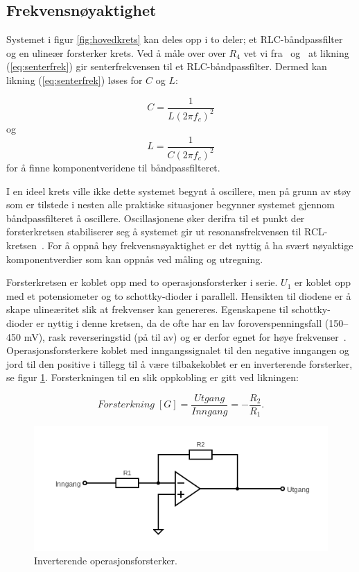 \documentclass[a4paper,11pt,norsk]{article}
\begin{document}
\subsection{Frekvensnøyaktighet}
\label{sub:frekvensnøyaktighet}
Systemet i figur \ref{fig:hovedkrets} kan deles opp i to deler; et RLC-båndpassfilter og en ulineær forsterker krets. Ved å måle over over $R_4$ vet vi fra~\cite{D2} og~\cite{D3} at likning (\ref{eq:senterfrek}) gir senterfrekvensen til et RLC-båndpassfilter.
Dermed kan likning (\ref{eq:senterfrek}) løses for $C$ og $L$:

\begin{equation}
    C = \frac{1}{L(2\pi f_c)^2}
    \label{eq:kondensatorverdi}
\end{equation}
og
\begin{equation}
    L = \frac{1}{C(2\pi f_c)^2}
\end{equation}
for å finne komponentveridene til båndpassfilteret. 

I en ideel krets ville ikke dette systemet begynt å oscillere, men på grunn av støy som er tilstede i nesten alle praktiske situasjoner begynner systemet gjennom båndpassfilteret å oscillere. Oscillasjonene øker derifra til et punkt der forsterkretsen stabiliserer seg å systemet gir ut resonansfrekvensen til RCL-kretsen~\cite{notat}. For å oppnå høy frekvensnøyaktighet er det nyttig å ha svært nøyaktige komponentverdier som kan oppnås ved måling og utregning. 

Forsterkretsen er koblet opp med to operasjonsforsterker i serie. $U_1$ er koblet opp med et potensiometer og to schottky-dioder i parallell. Hensikten til diodene er å skape ulineæritet slik at frekvenser kan genereres. Egenskapene til schottky-dioder er nyttig i denne kretsen, da de ofte har en lav foroverspenningsfall (150–450 mV), rask reverseringstid (på til av) og er derfor egnet for høye frekvenser~\cite{Schottky}. \newline
Operasjonsforsterkere koblet med inngangssignalet til den negative inngangen og jord til den positive i tillegg til å være tilbakekoblet er en inverterende forsterker, se figur \ref{fig:inv}. Forsterkningen til en slik oppkobling er gitt ved likningen: 

\begin{equation}
    Forsterkning\;[G] = \frac{Utgang}{Inngang} = -\frac{R_2}{R_1}.
    \label{eq:opamp}
\end{equation}

\begin{figure}[H]
  \centering
  \includegraphics[scale=0.6]{D1/Images/inv.png}
  \caption{Inverterende operasjonsforsterker.}
  \label{fig:inv}
\end{figure}
\end{document}
